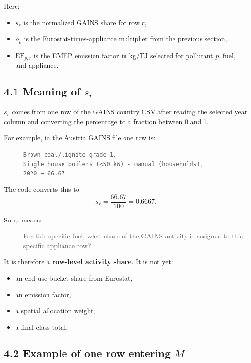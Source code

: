 \documentclass[11pt,a4paper]{article}
\begin{document}
Here:

\begin{itemize}[leftmargin=1.4em]
  \item $s_r$ is the normalized GAINS share for row $r$,
  \item $\rho_k$ is the Eurostat-times-appliance multiplier from the previous section,
  \item $\mathrm{EF}_{p,r}$ is the EMEP emission factor in kg/TJ selected for
  pollutant $p$, fuel, and appliance.
\end{itemize}

\subsection{4.1 Meaning of $s_r$}

$s_r$ comes from one row of the GAINS country CSV after reading the selected year
column and converting the percentage to a fraction between 0 and 1.

For example, in the Austria GAINS file one row is:

\begin{quote}
\texttt{Brown coal/lignite grade 1},\\
\texttt{Single house boilers (<50 kW) - manual (households)},\\
\texttt{2020 = 66.67}
\end{quote}

The code converts this to
\[
s_r = \frac{66.67}{100} = 0.6667.
\]

So $s_r$ means:

\begin{quote}
For this specific fuel, what share of the GAINS activity is assigned to this
specific appliance row?
\end{quote}

It is therefore a \textbf{row-level activity share}. It is not yet:

\begin{itemize}[leftmargin=1.4em]
  \item an end-use bucket share from Eurostat,
  \item an emission factor,
  \item a spatial allocation weight,
  \item a final class total.
\end{itemize}

\subsection{4.2 Example of one row entering $M$}
\end{document}

